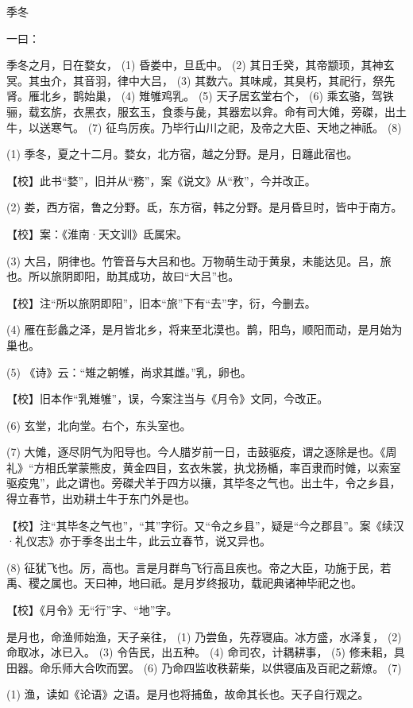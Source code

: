 \documentclass[12pt,UTF8]{ctexbook}
\begin{document}
季冬


一曰：

季冬之月，日在婺女， (1) 昏娄中，旦氐中。 (2) 其日壬癸，其帝颛顼，其神玄冥。其虫介，其音羽，律中大吕， (3) 其数六。其味咸，其臭朽，其祀行，祭先肾。雁北乡，鹊始巢， (4) 雉雊鸡乳。 (5) 天子居玄堂右个， (6) 乘玄骆，驾铁骊，载玄旂，衣黑衣，服玄玉，食黍与彘，其器宏以弇。命有司大傩，旁磔，出土牛，以送寒气。 (7) 征鸟厉疾。乃毕行山川之祀，及帝之大臣、天地之神祇。 (8)

(1) 季冬，夏之十二月。婺女，北方宿，越之分野。是月，日躔此宿也。

【校】此书“婺”，旧并从“務”，案《说文》从“敄”，今并改正。

(2) 娄，西方宿，鲁之分野。氐，东方宿，韩之分野。是月昏旦时，皆中于南方。

【校】案：《淮南·天文训》氐属宋。

(3) 大吕，阴律也。竹管音与大吕和也。万物萌生动于黄泉，未能达见。吕，旅也。所以旅阴即阳，助其成功，故曰“大吕”也。

【校】注“所以旅阴即阳”，旧本“旅”下有“去”字，衍，今删去。

(4) 雁在彭蠡之泽，是月皆北乡，将来至北漠也。鹊，阳鸟，顺阳而动，是月始为巢也。

(5) 《诗》云：“雉之朝雊，尚求其雌。”乳，卵也。

【校】旧本作“乳雉雊”，误，今案注当与《月令》文同，今改正。

(6) 玄堂，北向堂。右个，东头室也。

(7) 大傩，逐尽阴气为阳导也。今人腊岁前一日，击鼓驱疫，谓之逐除是也。《周礼》“方相氏掌蒙熊皮，黄金四目，玄衣朱裳，执戈扬楯，率百隶而时傩，以索室驱疫鬼”，此之谓也。旁磔犬羊于四方以攘，其毕冬之气也。出土牛，令之乡县，得立春节，出劝耕土牛于东门外是也。

【校】注“其毕冬之气也”，“其”字衍。又“令之乡县”，疑是“今之郡县”。案《续汉·礼仪志》亦于季冬出土牛，此云立春节，说又异也。

(8) 征犹飞也。厉，高也。言是月群鸟飞行高且疾也。帝之大臣，功施于民，若禹、稷之属也。天曰神，地曰祇。是月岁终报功，载祀典诸神毕祀之也。

【校】《月令》无“行”字、“地”字。

是月也，命渔师始渔，天子亲往， (1) 乃尝鱼，先荐寝庙。冰方盛，水泽复， (2) 命取冰，冰已入。 (3) 令告民，出五种。 (4) 命司农，计耦耕事， (5) 修耒耜，具田器。命乐师大合吹而罢。 (6) 乃命四监收秩薪柴，以供寝庙及百祀之薪燎。 (7)

(1) 渔，读如《论语》之语。是月也将捕鱼，故命其长也。天子自行观之。
\end{document}
